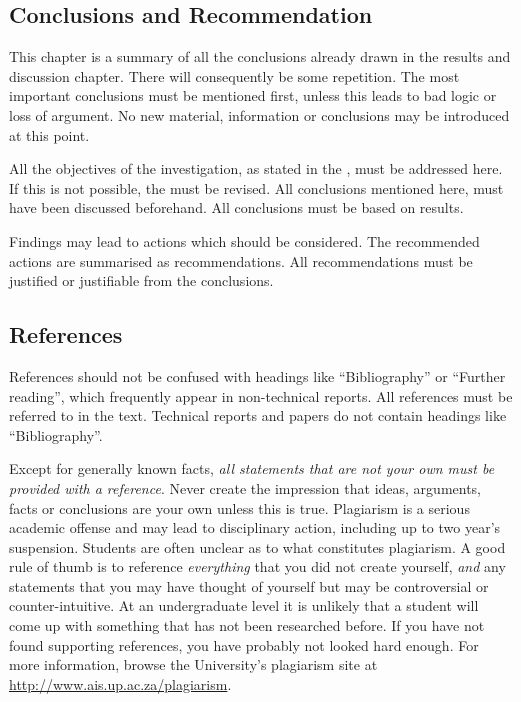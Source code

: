 \documentclass[a5paper, 10pt]{article}
\begin{document}
\subsection{Conclusions and Recommendation}
\label{sec:conclusions-and-recommendations}
This chapter is a summary of all the conclusions already drawn in the results and discussion chapter.
There will consequently be some repetition.
The most important conclusions must be mentioned first, unless this leads
to bad logic or loss of argument.  No new material, information or
conclusions may be introduced at this point.

All the objectives of the investigation, as stated in the
, must be addressed here.  
If this is not possible, the  must be revised.
All conclusions mentioned here, must have been discussed beforehand.  
All conclusions must be based on results.

Findings may lead to actions which should be considered.  The
recommended actions are summarised as recommendations.  All
recommendations must be justified or justifiable from the conclusions.

\subsection{References}
\label{sec:references}
References should not be confused with headings like ``Bibliography''
or ``Further reading'', which frequently appear in non-technical
reports.  All references must be referred to in the text. Technical
reports and papers do not contain headings like ``Bibliography''.

Except for generally known facts, \emph{all statements that are
not your own must be provided with a reference}.  Never create the
impression that ideas, arguments, facts or conclusions are your own
unless this is true.  Plagiarism is a serious academic offense and may lead to disciplinary action, including up to two year's suspension.
Students are often unclear as to what constitutes plagiarism.  A good
rule of thumb is to reference \emph{everything} that you did not
create yourself, \emph{and} any statements that you may have thought
of yourself but may be controversial or counter-intuitive.  At an
undergraduate level it is unlikely that a student will come up with
something that has not been researched before.  If you have not found
supporting references, you have probably not looked hard enough.  For
more information, browse the University's plagiarism site at
\url{http://www.ais.up.ac.za/plagiarism}.
\end{document}
